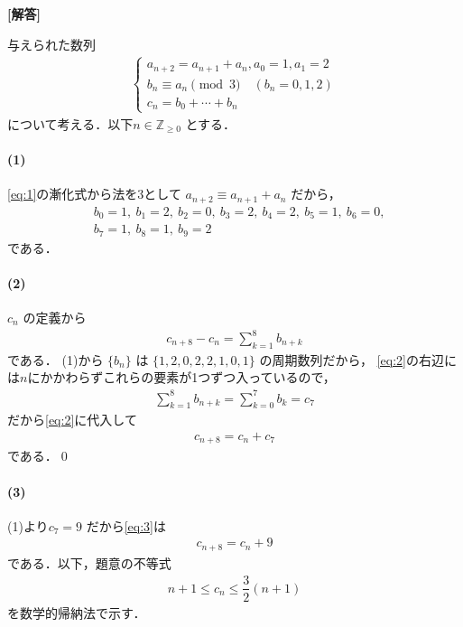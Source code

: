 \documentclass[../../main.tex]{subfiles}
\begin{document}
\begin{oframed}
  
\end{oframed}

{\bf [解答]}

与えられた数列
\begin{align}
  \begin{cases}
    a_{n+2}=a_{n+1}+a_n, a_0=1,a_1=2 \\
    b_n \equiv a_n \pmod 3 \quad (b_n=0,1,2) \\
    c_n=b_0+\cdots+b_n
  \end{cases} \label{eq:1}
\end{align}
について考える．以下$n \in \mathbb{Z}_{\ge 0}$ とする．

\paragraph{(1)}

\cref{eq:1}の漸化式から法を3として $a_{n+2} \equiv a_{n+1} + a_n$ だから，
\begin{align}
  &b_0 = 1,\ b_1 = 2,\ b_2 = 0,\ b_3 = 2,\ b_4 = 2,\ b_5 = 1,\ b_6 = 0, \\
  &b_7 = 1,\ b_8 = 1,\ b_9 = 2
\end{align}
である．

\paragraph{(2)}

$c_n$ の定義から
\begin{align}
  c_{n+8} - c_n = \sum_{k=1}^{8}b_{n+k} \label{eq:2}
\end{align}
である．
(1)から $\{b_n\}$ は $\{1, 2, 0, 2, 2, 1, 0, 1\}$ の周期数列だから，
\cref{eq:2}の右辺には$n$にかかわらずこれらの要素が1つずつ入っているので，
\begin{align}
  \sum_{k=1}^{8}b_{n+k} = \sum_{k=0}^7 b_k = c_7
\end{align}
だから\cref{eq:2}に代入して
\begin{align}
  c_{n+8} = c_n + c_7 \label{eq:3}
\end{align}
である．\qed

\paragraph{(3)}

(1)より$c_7 = 9$ だから\cref{eq:3}は
\begin{align}
  c_{n+8} = c_n + 9 \label{eq:4}
\end{align}
である．以下，題意の不等式
\begin{align}
  n+1 \le c_n \le \dfrac{3}{2}(n+1) \label{eq:5}
\end{align}
を数学的帰納法で示す．
\end{document}
